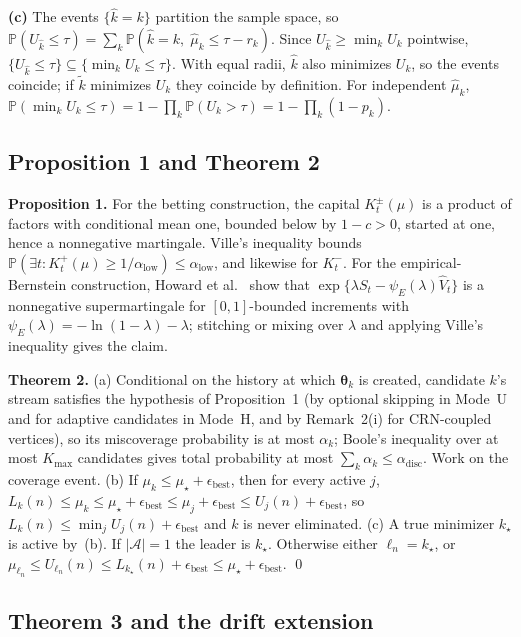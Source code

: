 \documentclass[a4paper,onecolumn,unpublished]{quantumarticle}
\newcommand{\Prob}{\mathbb{P}}
\newcommand{\adisc}{\alpha_{\mathrm{disc}}}
\newcommand{\epsbest}{\epsilon_{\mathrm{best}}}
\newcommand{\Kmax}{K_{\max}}
\renewcommand{\th}{\bm{\theta}}
\begin{document}
\noindent\textbf{(c)} The events $\{\hat k = k\}$ partition the sample space, so $\Prob(U_{\hat k} \le \tau) = \sum_k \Prob(\hat k = k,\; \widehat\mu_k \le \tau - r_k)$. Since $U_{\hat k} \ge \min_k U_k$ pointwise, $\{U_{\hat k} \le \tau\} \subseteq \{\min_k U_k \le \tau\}$. With equal radii, $\hat k$ also minimizes $U_k$, so the events coincide; if $\tilde k$ minimizes $U_k$ they coincide by definition. For independent $\widehat\mu_k$, $\Prob(\min_k U_k \le \tau) = 1 - \prod_k \Prob(U_k > \tau) = 1 - \prod_k (1 - p_k)$.

\subsection{Proposition 1 and Theorem 2}
\label{app:proof_thm2}

\noindent\textbf{Proposition 1.} For the betting construction, the capital $K_t^\pm(\mu)$ is a product of factors with conditional mean one, bounded below by $1 - c > 0$, started at one, hence a nonnegative martingale. Ville's inequality bounds $\Prob(\exists t : K_t^+(\mu) \ge 1/\alpha_{\mathrm{low}}) \le \alpha_{\mathrm{low}}$, and likewise for $K_t^-$. For the empirical-Bernstein construction, Howard et al.\ \cite{howard2021} show that $\exp\{\lambda S_t - \psi_E(\lambda)\widehat V_t\}$ is a nonnegative supermartingale for $[0, 1]$-bounded increments with $\psi_E(\lambda) = -\ln(1 - \lambda) - \lambda$; stitching or mixing over $\lambda$ and applying Ville's inequality gives the claim.

\noindent\textbf{Theorem 2.} (a) Conditional on the history at which $\th_k$ is created, candidate $k$'s stream satisfies the hypothesis of Proposition~1 (by optional skipping in Mode~U and for adaptive candidates in Mode~H, and by Remark~2(i) for CRN-coupled vertices), so its miscoverage probability is at most $\alpha_k$; Boole's inequality over at most $\Kmax$ candidates gives total probability at most $\sum_k \alpha_k \le \adisc$. Work on the coverage event. (b) If $\mu_k \le \mu_\star + \epsbest$, then for every active $j$, $L_k(n) \le \mu_k \le \mu_\star + \epsbest \le \mu_j + \epsbest \le U_j(n) + \epsbest$, so $L_k(n) \le \min_j U_j(n) + \epsbest$ and $k$ is never eliminated. (c) A true minimizer $k_\star$ is active by~(b). If $|\mathcal{A}| = 1$ the leader is $k_\star$. Otherwise either $\ell_n = k_\star$, or $\mu_{\ell_n} \le U_{\ell_n}(n) \le L_{k_\star}(n) + \epsbest \le \mu_\star + \epsbest$. \qed

\subsection{Theorem 3 and the drift extension}
\label{app:proof_thm3}
\end{document}
